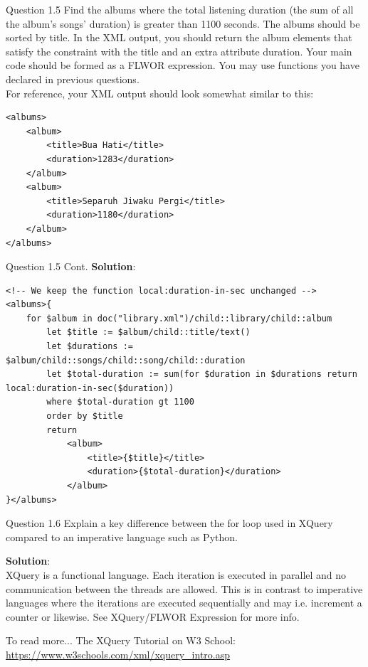 \begin{frame}[fragile]{Question 1.5}
Find the albums where the total listening duration (the sum of all the album's songs' duration) is greater than 1100 seconds. The albums should be sorted by title. In the XML output, you should return the album elements that satisfy the constraint with the title and an extra attribute duration. Your main code should be formed as a FLWOR expression. You may use functions you have declared in previous questions.\\\vspace{5pt}
For reference, your XML output should look somewhat similar to this:\\\vspace{5pt}

\begin{lstlisting}[style=xml-small-nomargin]
<albums>
	<album>
		<title>Bua Hati</title>
		<duration>1283</duration>
	</album>
	<album>
		<title>Separuh Jiwaku Pergi</title>
		<duration>1180</duration>
	</album>
</albums>
\end{lstlisting}\vspace{5pt}	
\end{frame}

\begin{frame}[fragile]{Question 1.5 Cont.}
\textbf{Solution}: \\
\begin{lstlisting}[style=xml-small-nomargin]
<!-- We keep the function local:duration-in-sec unchanged -->
<albums>{
	for $album in doc("library.xml")/child::library/child::album
		let $title := $album/child::title/text()
		let $durations := $album/child::songs/child::song/child::duration
		let $total-duration := sum(for $duration in $durations return local:duration-in-sec($duration))
		where $total-duration gt 1100
		order by $title
		return
			<album>
				<title>{$title}</title>
				<duration>{$total-duration}</duration>
			</album>
}</albums>
\end{lstlisting}
\end{frame}


\begin{frame}[fragile]{Question 1.6}
Explain a key difference between the for loop used in XQuery compared to an imperative language such as Python.\\\vspace{10pt}

\textbf{Solution}: \\
XQuery is a functional language. Each iteration is executed in parallel and no communication between the threads are allowed. This is in contrast to imperative languages where the iterations are executed sequentially and may i.e. increment a counter or likewise. See XQuery/FLWOR Expression for more info.

\begin{block}{To read more...}
The XQuery Tutorial on W3 School: \url{https://www.w3schools.com/xml/xquery_intro.asp}
\end{block}	
\end{frame}

